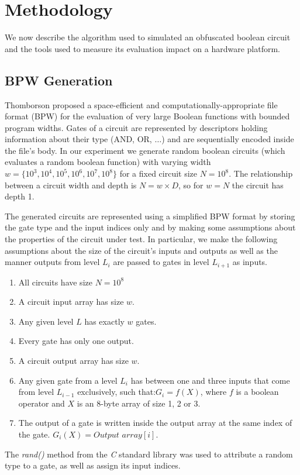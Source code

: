 \section{Methodology}
We now describe the algorithm used to simulated an obfuscated boolean circuit and the tools used to measure its evaluation impact on a hardware platform.
\subsection{BPW Generation} 
Thomborson proposed a space-efficient and computationally-appropriate file format (BPW) for the evaluation of very large Boolean functions with bounded program widths\cite{clark}. Gates of a circuit are represented by descriptors holding information about their type (AND, OR, $\dots$) and are sequentially encoded inside the file's body. In our experiment we generate random boolean circuits (which evaluates a random boolean function) with varying width $w = \{ 10^3, 10^4, 10^5, 10^6, 10^7, 10^8\}$ for a fixed circuit size $N = 10^8$. The relationship between a circuit width and depth is $ N = w \times D $, so for $ w = N$ the circuit has depth 1.
\par
The generated circuits are represented using a simplified BPW format by storing the gate type and the input indices only and by making some assumptions about the properties of the circuit under test. In particular, we make the following assumptions about the size of the circuit's inputs and outputs as well as the manner outputs from level $L_i$ are passed to gates in level $L_{i+1}$ as inputs.
\begin{enumerate}  
\item All circuits have size $N = 10^8$
\item A circuit input array has size $w$.
\item Any given level $L$ has exactly $w$ gates.
\item Every gate has only one output.
\item A circuit output array has size $w$.
\item Any given gate from a level $L_i$ has between one and three inputs that come from level $L_{i-1}$ exclusively, such that:\break $G_i = f(X)$, where $f$ is a boolean operator and $X$ is an 8-byte array of size 1, 2 or 3. 
\item The output of a gate is written inside the output array at the same index of the gate. $G_i(X) = Output$ $array[i]$.
\end{enumerate}
The \textit{rand()} method from the \textit{C} standard library was used to attribute a random type to a gate, as well as assign its input indices.

